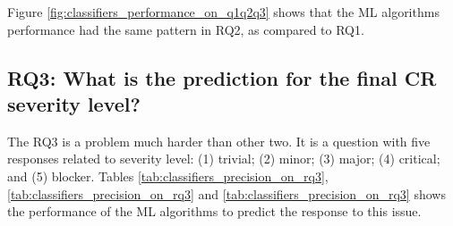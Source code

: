 Figure \ref{fig:classifiers_performance_on_q1q2q3} shows that the ML algorithms performance had the same pattern in RQ2, as compared to RQ1. 

\subsection{RQ3: What is the prediction for the final CR severity level?}\label{subsec:rq3}

The RQ3 is a problem much harder than other two. It is a question with five responses related to severity level: (1) trivial; (2) minor; (3) major; (4) critical; and (5) blocker. Tables \ref{tab:classifiers_precision_on_rq3}, \ref{tab:classifiers_precision_on_rq3} and \ref{tab:classifiers_precision_on_rq3} shows the performance of the ML algorithms to predict the response to this issue. 

